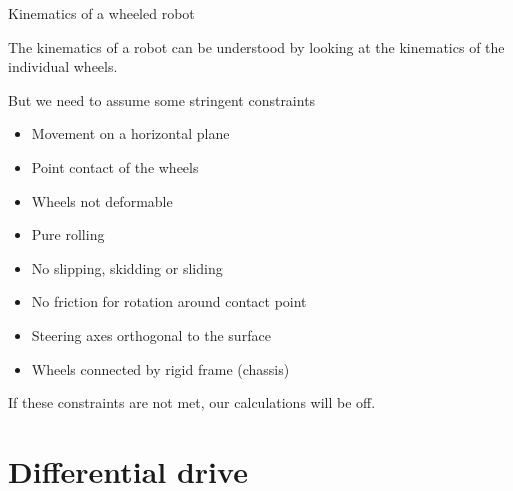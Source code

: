 \documentclass[compress]{beamer}
\begin{document}
\begin{frame}{Kinematics of a wheeled robot}

The kinematics of a robot can be understood by looking at the kinematics
of the individual wheels.

But we need to assume some stringent constraints

\begin{itemize}
    \item Movement on a horizontal plane
    \item Point contact of the wheels
    \item Wheels not deformable
    \item Pure rolling
    \item No slipping, skidding or sliding
    \item No friction for rotation around contact point
    \item Steering axes orthogonal to the surface
    \item Wheels connected by rigid frame (chassis)
\end{itemize}

If these constraints are not met, our calculations will be off.

\end{frame}

\section{Differential drive}
\end{document}

